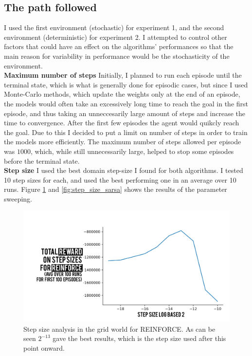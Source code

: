 \documentclass[10pt, letterpaper, twocolumn]{article}
\begin{document}
	\subsection{The path followed}
	
	\noindent I used the first environment (stochastic) for experiment 1, and the second environment (deterministic) for experiment 2. I attempted to control other factors that could have an effect on the algorithms' performances so that the main reason for variability in performance would be the stochasticity of the environment. \\
	
	\noindent \textbf{Maximum number of steps} Initially, I planned to run each episode until the terminal state, which is what is generally done for episodic cases, but since I used Monte-Carlo methods, which update the weights only at the end of an episode, the models would often take an excessively long time to reach the goal in the first episode, and thus taking an unneccesarily large amount of steps and increase the time to convergence. After the first few episodes the agent would quikcly reach the goal. Due to this I decided to put a limit on number of steps in order to train the models more efficiently. The maximum number of steps allowed per episode was $1000$, which, while still unnecessarily large, helped to stop some episodes before the terminal state. \\
	
	\noindent \textbf{Step size} I used the best domain step-size I found for both algorithms. I tested 10 step sizes for each, and used the best performing one in an average over 10 runs. Figure \ref{fig:step_size_reinforce} and \ref{fig:step_size_sarsa} shows the results of the parameter sweeping.\\
	
	\begin{figure}[h]
		\centering
		\includegraphics[width=\linewidth]{figure_parameter_reinforce}
		\caption{\small Step size analysis in the grid world for REINFORCE. As can be seen $2^{-13}$ gave the best results, which is the step size used after this point onward.}
		\label{fig:step_size_reinforce}
	\end{figure}
	
\end{document}
